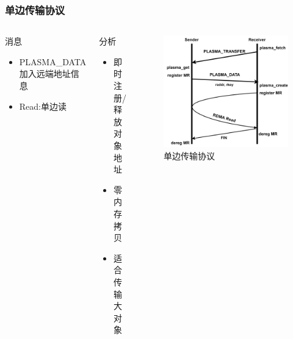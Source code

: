 \begin{frame}
	\frametitle{单边传输协议}
	\begin{columns}[onlytextwidth]
		\begin{block}{消息}
			\begin{itemize}
				\item PLASMA\_DATA\\加入远端地址信息
				\item Read:单边读
			\end{itemize}
		\end{block}
		\begin{block}{分析}
			\begin{itemize}
				\item 即时注册/释放对象地址
				\item 零内存拷贝
				\item 适合传输大对象
			\end{itemize}
		\end{block}
		\begin{figure}
			\centering
			\includegraphics[width=\textwidth]{image/chap03/read_protocol.png}
			\caption{单边传输协议}
		\end{figure}
	\end{columns}
\end{frame}